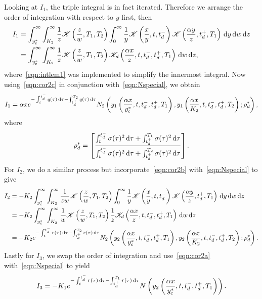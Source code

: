 Looking at $I_1$, the triple integral is in fact iterated. Therefore we arrange the order of integration with respect to $y$ first, then
		\begin{align*}
			I_1 &=  \int_{y_\mathrm{c}^*}^\infty \int_{K_2}^\infty \frac{1}{z} \mathscr K\left( \frac{z}{w}, T_1, T_2 \right)\int_0^\infty \frac{1}{y}\mathscr K\left( \frac{x}{y}, t, t_d^- \right) \mathscr K\left( \frac{\alpha y}{z}, t_d^+, T_1 \right) \, \mathrm d y \, \mathrm d w \, \mathrm d z \\
			& =\int_{y_\mathrm{c}^*}^\infty \int_{K_2}^\infty \frac{1}{z} \mathscr K\left( \frac{z}{w}, T_1, T_2 \right)\mathscr K_d\left( \frac{\alpha x}{z}, t, t_d^-, t_d^+, T_1 \right) \,  \mathrm d w \, \mathrm d z,
		\end{align*}
where~\eqref{eqn:intlem1} was implemented to simplify the innermost integral. Now using~\eqref{eqn:cor2c} in conjunction with~\eqref{eqn:Nspecial}, we obtain
	$$
		I_1 = \alpha xe^{-\int_t^{t_d^-} q(\tau) \, \mathrm d\tau - \int_{t_d^+}^{T_2} q(\tau)\,\mathrm d\tau}N_2\left( y_1\left( \frac{\alpha x}{y_\text{c}^*}, t, t_d^-, t_d^+, T_1 \right), y_1\left( \frac{\alpha x}{K_2}, t, t_d^-, t_d^+, T_2 \right); \rho_d^* \right),
	$$
where
	$$
		\rho_d^* = \left[ \frac{\int_t^{t_d^-} \sigma(\tau)^2 \,\mathrm d\tau + \int_{t_d^+}^{T_1} \sigma(\tau)^2 \, \mathrm d\tau}{\int_t^{t_d^-} \sigma(\tau)^2 \,\mathrm d\tau + \int_{t_d^+}^{T_2} \sigma(\tau)^2 \,\mathrm d\tau} \right].
	$$
For $I_2$, we do a similar process but incorporate~\eqref{eqn:cor2b} with~\eqref{eqn:Nspecial} to give
	\begin{align*}
		 I_2 &=  -K_2\int_{y_\mathrm{c}^*}^\infty \int_{K_2}^\infty \frac{1}{zw} \mathscr K\left( \frac{z}{w}, T_1, T_2 \right)\int_0^\infty \frac{1}{y}\mathscr K\left( \frac{x}{y}, t, t_d^- \right) \mathscr K\left( \frac{\alpha y}{z}, t_d^+, T_1 \right) \, \mathrm d y \, \mathrm d w \, \mathrm d z \\
			& =-K_2\int_{y_\mathrm{c}^*}^\infty \int_{K_2}^\infty \frac{1}{w} \mathscr K\left( \frac{z}{w}, T_1, T_2 \right)\frac{1}{z}\mathscr K_d\left( \frac{\alpha x}{z}, t, t_d^-, t_d^+, T_1 \right) \,  \mathrm d w \, \mathrm d z \\
			&= -K_2e^{-\int_t^{t_d^-} r(\tau) \, \mathrm d\tau - \int_{t_d^+}^{T_2} r(\tau)\,\mathrm d\tau}N_2\left( y_2\left( \frac{\alpha x}{y_\text{c}^*}, t, t_d^-, t_d^+, T_1 \right), y_2\left( \frac{\alpha x}{K_2}, t, t_d^-, t_d^+, T_2 \right); \rho_d^* \right).
	\end{align*}
Lastly for $I_3$, we swap the order of integration and use~\eqref{eqn:cor2a} with~\eqref{eqn:Nspecial} to yield
	\begin{align*}
		I_3 = -K_1e^{-\int_t^{t_d^-} r(\tau) \, \mathrm d\tau - \int_{t_d^+}^{T_1} r(\tau)\,\mathrm d\tau}N\left( y_2\left( \frac{\alpha x}{y_\text{c}^*}, t, t_d^-, t_d^+, T_1 \right) \right).
	\end{align*}
